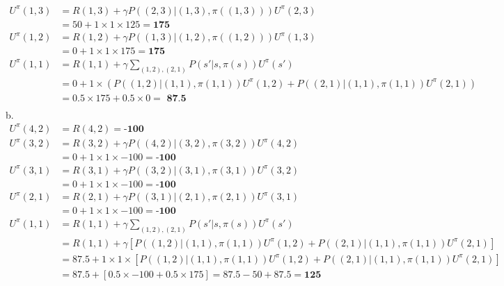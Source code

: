\documentclass[a4paper]{article}
\begin{document}
$$\begin{align*}
    U^{\pi} (1,3) &= R(1,3) + \gamma P( (2,3) | (1,3), \pi( (1,3))) U^{\pi} (2,3) \\
                             &= 50 + 1 \times 1 \times 125 = \textbf{175} \\
    U^{\pi} (1,2) &= R(1,2) + \gamma P( (1,3) | (1,2), \pi( (1,2) )) U^{\pi} (1,3) \\
                             &= 0 + 1 \times 1 \times 175 = \textbf{175} \\
    U^{\pi} (1,1) &= R(1,1) + \gamma \sum_{ (1,2), (2,1) } P(s' | s, \pi(s) ) U^{\pi} (s') \\
                             &= 0 + 1 \times \left( P( (1,2) | (1,1), \pi(1,1) ) U^{\pi} (1,2) + P( (2,1) | (1,1), \pi(1,1)) U^{\pi} (2,1) \right) \\
                             &= 0.5 \times 175 + 0.5 \times 0 = \textbf{ 87.5} \\
\end{align*}
b. \\
\begin{align*}
    U^{\pi} (4,2) &= R(4,2) = \textbf{-100} \\
    U^{\pi} (3,2) &= R(3,2) + \gamma P( (4,2) | (3,2), \pi(3,2)) U^{\pi} (4,2) \\
                             &= 0 + 1 \times 1 \times -100 = \textbf{-100} \\
    U^{\pi} (3,1) &= R(3,1) + \gamma P( (3,2) | (3,1), \pi(3,1)) U^{\pi} (3,2) \\
                             &= 0 + 1 \times 1 \times -100 = \textbf{-100} \\
    U^{\pi} (2,1) &= R(2,1) + \gamma P( (3,1) | (2,1), \pi(2,1)) U^{\pi} (3,1) \\
                             &= 0 + 1 \times 1 \times -100 = \textbf{-100} \\
    U^{\pi} (1,1) &= R(1,1) + \gamma \sum_{ (1,2), (2,1) } P(s' | s, \pi(s)) U^{\pi} (s') \\
                             &= R(1,1) + \gamma \left[ P( (1,2) | (1,1), \pi(1,1)) U^{\pi} (1,2) + P( (2,1) | (1,1), \pi(1,1)) U^{\pi} (2,1) \right] \\
                             &= 87.5 + 1 \times 1 \times \left[ P( (1,2) | (1,1), \pi(1,1)) U^{\pi} (1,2) + P( (2,1) | (1,1), \pi(1,1)) U^{\pi} (2,1) \right] \\
                             &= 87.5 + \left[ 0.5 \times -100 + 0.5 \times 175 \right] = 87.5 -50 + 87.5 = \textbf{125} \\
\end{align*}
\\
\end{document}
